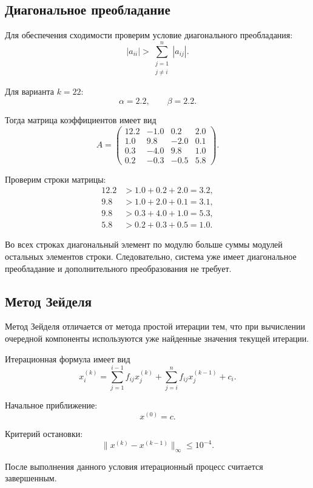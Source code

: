 \subsection*{Диагональное преобладание}

Для обеспечения сходимости проверим условие диагонального преобладания:
\[
    |a_{ii}| >
    \sum_{\substack{j=1 \\ j \ne i}}^{n} |a_{ij}|.
\]

Для варианта $k = 22$:
\[
    \alpha = 2.2,
    \qquad
    \beta = 2.2.
\]

Тогда матрица коэффициентов имеет вид
\[
A =
\begin{pmatrix}
12.2 & -1.0 & 0.2 & 2.0 \\
1.0 & 9.8 & -2.0 & 0.1 \\
0.3 & -4.0 & 9.8 & 1.0 \\
0.2 & -0.3 & -0.5 & 5.8
\end{pmatrix}.
\]

Проверим строки матрицы:
\[
\begin{aligned}
12.2 &> 1.0 + 0.2 + 2.0 = 3.2, \\
9.8 &> 1.0 + 2.0 + 0.1 = 3.1, \\
9.8 &> 0.3 + 4.0 + 1.0 = 5.3, \\
5.8 &> 0.2 + 0.3 + 0.5 = 1.0.
\end{aligned}
\]

Во всех строках диагональный элемент по модулю больше суммы модулей остальных элементов строки. Следовательно, система уже имеет диагональное преобладание и дополнительного преобразования не требует.

\subsection*{Метод Зейделя}

Метод Зейделя отличается от метода простой итерации тем, что при вычислении очередной компоненты используются уже найденные значения текущей итерации.

Итерационная формула имеет вид
\[
x_i^{(k)}
=
\sum_{j=1}^{i-1} f_{ij}x_j^{(k)}
+
\sum_{j=i}^{n} f_{ij}x_j^{(k-1)}
+
c_i.
\]

Начальное приближение:
\[
    x^{(0)} = c.
\]

Критерий остановки:
\[
    \|x^{(k)} - x^{(k-1)}\|_{\infty} \le 10^{-4}.
\]

После выполнения данного условия итерационный процесс считается завершенным.